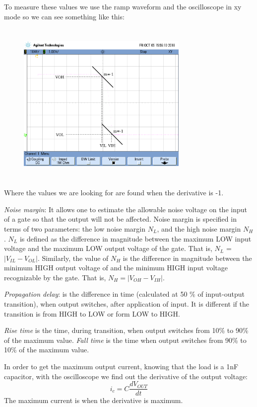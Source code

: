 To measure these values we use the ramp waveform and the oscilloscope in xy mode so we can see something like this:
\begin{figure}[H] 
    \begin{center}
    \includegraphics[width=8.25cm,height=8cm]{data/xy_ttl_bjt.png}
    \end{center}
    \caption{}
    \label{fig:measures}
    \end{figure}     
Where the values we are looking for are found when the derivative is -1.

\textit{Noise margin}: It allows one to estimate the allowable noise voltage on the input of a 
gate so that the output will not be affected. Noise margin is specified
 in terms of two parameters: the low noise margin $N_{L}$, and the high noise 
 margin $N_{H}$. $N_{L}$ is defined as the difference in magnitude
  between the maximum LOW input voltage and the maximum 
  LOW output voltage of the gate. That is, $N_{L}$ =$|V_{IL} - V_{OL}|$.
   Similarly, the value of $N_{H}$ is the difference in 
   magnitude between the minimum HIGH output voltage of 
   and the minimum HIGH input voltage recognizable by 
   the gate. That is, $N_{H} =|V_{OH} - V_{IH}|.$ 


\textit{Propagation delay}:  is the difference in time (calculated at 50
\% of input-output transition), when output switches, after 
application of input. It is different if the transition is
 from HIGH to LOW or form LOW to HIGH.

\textit{Rise time} is the time, during transition, when output switches from 10\% to 90\% of the maximum value.
\textit{Fall time} is the time when output switches from 90\% to 10\% of the maximum value.

In order to get the maximum output current, knowing that the
 load is a 1nF capacitor, with the oscilloscope we find out
  the derivative of the output voltage:
\begin{equation}
    i_{c}=C\frac{dV_{OUT}}{dt}
\end{equation}
The maximum current is when the derivative is maximum.
